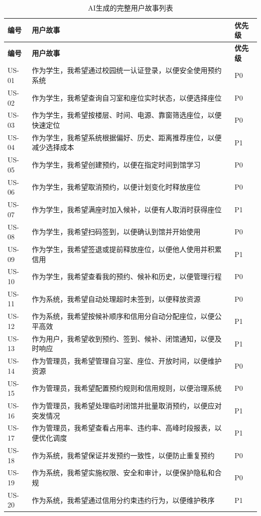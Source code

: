 \documentclass[11pt,a4paper]{article}
\begin{document}
\begin{longtable}{@{}p{}p{}p{}@{}}
    \caption{AI生成的完整用户故事列表} \\
    \toprule
    \textbf{编号} & \textbf{用户故事} & \textbf{优先级} \\
    \midrule
    \endfirsthead
    \toprule
    \textbf{编号} & \textbf{用户故事} & \textbf{优先级} \\
    \midrule
    \endhead
    \bottomrule
    \endlastfoot
        US-01 & 作为学生，我希望通过校园统一认证登录，以便安全使用预约系统 & P0 \\
        \midrule
        US-02 & 作为学生，我希望查询自习室和座位实时状态，以便选择座位 & P0 \\
        \midrule
        US-03 & 作为学生，我希望按楼层、时间、电源、靠窗筛选座位，以便快速定位 & P0 \\
        \midrule
        US-04 & 作为学生，我希望系统根据偏好、历史、距离推荐座位，以便减少选择成本 & P1 \\
        \midrule
        US-05 & 作为学生，我希望创建预约，以便在指定时间到馆学习 & P0 \\
        \midrule
        US-06 & 作为学生，我希望取消预约，以便计划变化时释放座位 & P0 \\
        \midrule
        US-07 & 作为学生，我希望满座时加入候补，以便有人取消时获得座位 & P1 \\
        \midrule
        US-08 & 作为学生，我希望扫码签到，以便确认到馆并开始使用 & P0 \\
        \midrule
        US-09 & 作为学生，我希望签退或提前释放座位，以便他人使用并积累信用 & P1 \\
        \midrule
        US-10 & 作为学生，我希望查看我的预约、候补和历史，以便管理行程 & P0 \\
        \midrule
        US-11 & 作为系统，我希望自动处理超时未签到，以便释放资源 & P0 \\
        \midrule
        US-12 & 作为系统，我希望按候补顺序和信用分自动分配座位，以便公平高效 & P1 \\
        \midrule
        US-13 & 作为用户，我希望收到预约、签到、候补、闭馆通知，以便及时响应 & P1 \\
        \midrule
        US-14 & 作为管理员，我希望管理自习室、座位、开放时间，以便维护资源 & P0 \\
        \midrule
        US-15 & 作为管理员，我希望配置预约规则和信用规则，以便治理系统 & P0 \\
        \midrule
        US-16 & 作为管理员，我希望处理临时闭馆并批量取消预约，以便应对突发情况 & P1 \\
        \midrule
        US-17 & 作为管理员，我希望查看占用率、违约率、高峰时段报表，以便优化调度 & P1 \\
        \midrule
        US-18 & 作为系统，我希望保证并发预约一致性，以便防止重复预约 & P0 \\
        \midrule
        US-19 & 作为系统，我希望实施权限、安全和审计，以便保护隐私和合规 & P0 \\
        \midrule
        US-20 & 作为系统，我希望通过信用分约束违约行为，以便维护秩序 & P1 \\
\end{longtable}
\end{document}
